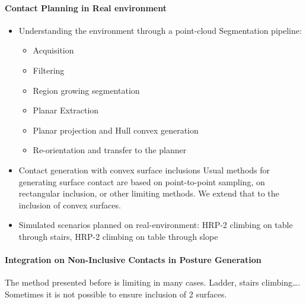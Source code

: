 \documentclass{article}
\begin{document}
\paragraph {Contact Planning in Real environment}
\begin{itemize}
  \item Understanding the environment through a point-cloud
    Segmentation pipeline:
    \begin{itemize}
      \item Acquisition
      \item Filtering
      \item Region growing segmentation
      \item Planar Extraction
      \item Planar projection and Hull convex generation
      \item Re-orientation and transfer to the planner
    \end{itemize}
  \item Contact generation with convex surface inclusions
Usual methods for generating surface contact are based on point-to-point sampling, on rectangular inclusion, or other limiting methods. We extend that to the inclusion of convex surfaces.
  \item{Simulated scenarios planned on real-environment: HRP-2 climbing on table through stairs, HRP-2 climbing on table through slope}
\end{itemize}



\paragraph{Integration on Non-Inclusive Contacts in Posture Generation}

The method presented before is limiting in many cases. Ladder, stairs climbing\dots.
Sometimes it is not possible to ensure inclusion of 2 surfaces.
\end{document}
